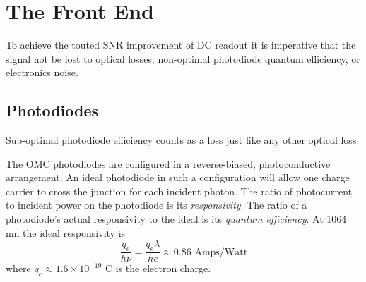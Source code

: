 \section{The Front End}

To achieve the touted SNR improvement of DC readout it is imperative
that the signal not be lost to optical losses, non-optimal photodiode
quantum efficiency, or electronics noise.

\subsection{Photodiodes}

Sub-optimal photodiode efficiency counts as a loss just like any other
optical loss. 

The OMC photodiodes are configured in a reverse-biased,
photoconductive arrangement.  An ideal photodiode in such a
configuration will allow one charge carrier to cross the junction for
each incident photon.  The ratio of photocurrent to incident power on
the photodiode is its \emph{responsivity}.  The ratio of a
photodiode's actual responsivity to the ideal is its \emph{quantum
  efficiency}.  At 1064 nm the ideal responsivity is
%
\begin{equation}
\frac{q_e}{h \nu} = \frac{q_e \lambda}{h c} \approx 0.86 \text{ Amps/Watt}
\end{equation}
where $q_e\approx 1.6\times10^{-19}\text{ C}$ is the electron charge.

